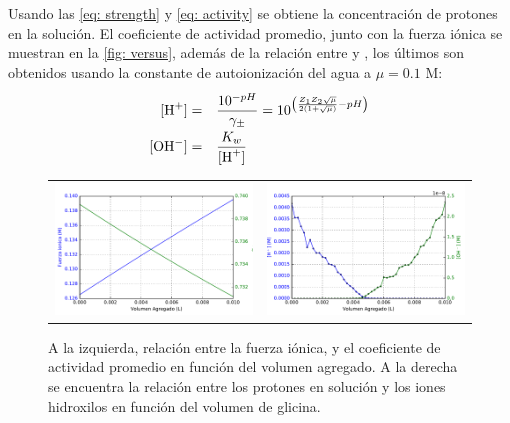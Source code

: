 \documentclass[fleqn,10pt]{SelfArx} %
\begin{document}
	Usando las \autoref{eq: strength} y \autoref{eq: activity} se obtiene la concentraci\'on de protones en la soluci\'on. El coeficiente de actividad promedio, junto con la fuerza i\'onica se muestran en la \autoref{fig: versus}, adem\'as de la relaci\'on entre \ce{[H^+]} y \ce{[OH^{-}]}, los \'ultimos son obtenidos usando la constante de autoionizaci\'on del agua a $\mu = 0.1$ M:
	\begin{equation}
		\def\arraystretch{2}
		\begin{array}{rl}
			\ce{[H+]} = & \dfrac{10^{-pH}}{\gamma_\pm} = 10^{\left(\frac{Z_1Z_2\sqrt{\mu}}{2\left(1+\sqrt{\mu}\right)} - pH\right)} \\
			\ce{[OH^{-}]} = & \dfrac{K_w}{\ce{[H+]}}
		\end{array}
	\end{equation}
	
	\begin{figure}[h]
		\centering
		\begin{tabular}{cc}
			\includegraphics[width=0.5\linewidth]{images/ionic_strength.pdf} & \includegraphics[width=0.5\linewidth]{images/HOH.pdf}
		\end{tabular}
		\caption{A la izquierda, relaci\'on entre la fuerza i\'onica, y el coeficiente de actividad promedio en funci\'on del volumen agregado. A la derecha se encuentra la relaci\'on entre los protones en soluci\'on y los iones hidroxilos en funci\'on del volumen de glicina.}
		\label{fig: versus}
	\end{figure}
	\pagebreak
	
\end{document}

